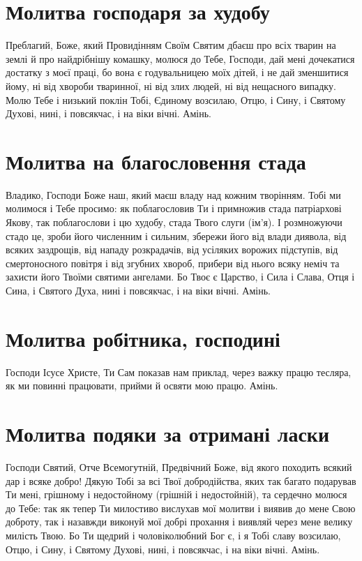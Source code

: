 \documentclass[chapters.tex]{subfiles}
\begin{document}
\section{Молитва господаря за худобу}
Преблагий, Боже, який Провидінням Своїм Святим дбаєш про всіх тварин на землі й про найдрібнішу комашку, молюся до Тебе, Господи, дай мені дочекатися достатку з моєї праці, бо вона є годувальницею моїх дітей, і не дай зменшитися йому, ні від хвороби тваринної, ні від злих людей, ні від нещасного випадку. Молю Тебе і низький поклін Тобі, Єдиному возсилаю, Отцю, і Сину, і Святому Духові, нині, і повсякчас, і на віки вічні. Амінь.

\section{Молитва на благословення стада}
Владико, Господи Боже наш, який маєш владу над кожним творінням. Тобі ми молимося і Тебе просимо: як поблагословив Ти і примножив стада патріархові Якову, так поблагослови і цю худобу, стада Твого слуги (ім’я). І розмножуючи стадо це, зроби його численним і сильним, збережи його від влади диявола, від всяких заздрощів, від нападу розкрадачів, від усіляких ворожих підступів, від смертоносного повітря і від згубних хвороб, прибери від нього всяку неміч та захисти його Твоїми святими ангелами. Бо Твоє є Царство, і Сила і Слава, Отця і Сина, і Святого Духа, нині і повсякчас, і на віки вічні. Амінь.

\section{Молитва робітника, господині}
Господи Ісусе Христе, Ти Сам показав нам приклад, через важку працю тесляра, як ми повинні працювати, прийми й освяти мою працю. Амінь.

\section{Молитва подяки за отримані ласки}
Господи Святий, Отче Всемогутній, Предвічний Боже, від якого походить всякий дар і всяке добро! Дякую Тобі за всі Твої добродійства, яких так багато подарував Ти мені, грішному і недостойному (грішній і недостойній), та сердечно молюся до Тебе: так як тепер Ти милостиво вислухав мої молитви і виявив до мене Свою доброту, так і назавжди виконуй мої добрі прохання і виявляй через мене велику милість Твою. Бо Ти щедрий і чоловіколюбний Бог є, і я Тобі славу возсилаю, Отцю, і Сину, і Святому Духові, нині, і повсякчас, і на віки вічні. Амінь.
\end{document}
